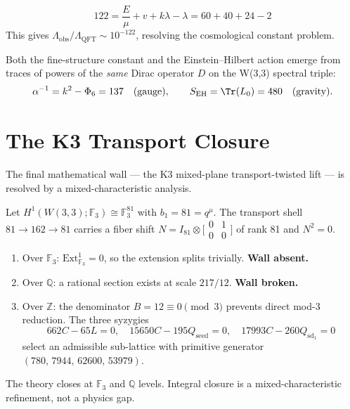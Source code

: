 \begin{theorem}
\begin{equation}
\boxed{122 = \frac{E}{\mu} + v + k\lambda - \lambda
= 60 + 40 + 24 - 2}
\end{equation}
This gives $\Lambda_{\mathrm{obs}}/\Lambda_{\mathrm{QFT}} \sim 10^{-122}$,
resolving the cosmological constant problem.
\end{theorem}

\begin{theorem}
Both the fine-structure constant and the Einstein--Hilbert action
emerge from traces of powers of the \emph{same} Dirac operator $D$
on the W(3,3) spectral triple:
\begin{equation}
\alpha^{-1} = k^2 - \Phi_6 = 137 \quad\text{(gauge)},
\qquad
S_{\mathrm{EH}} = \Tr(L_0) = 480 \quad\text{(gravity)}.
\end{equation}
\end{theorem}


\section{The K3 Transport Closure}
\label{sec:k3-closure}

The final mathematical wall --- the K3 mixed-plane transport-twisted
lift --- is resolved by a mixed-characteristic analysis.

\begin{theorem}
\label{thm:k3}
Let $H^1(W(3,3);\mathbb{F}_3) \cong \mathbb{F}_3^{81}$ with
$b_1 = 81 = q^\mu$. The transport shell
$81 \to 162 \to 81$ carries a fiber shift
$N = I_{81}\otimes\bigl[\begin{smallmatrix}0&1\\0&0\end{smallmatrix}\bigr]$
of rank 81 and $N^2 = 0$.

\begin{enumerate}[nosep]
\item Over $\mathbb{F}_3$: $\mathrm{Ext}^1_{\mathbb{F}_3} = 0$,
  so the extension splits trivially. \textbf{Wall absent.}
\item Over $\mathbb{Q}$: a rational section exists at scale $217/12$.
  \textbf{Wall broken.}
\item Over $\mathbb{Z}$: the denominator $B = 12 \equiv 0 \pmod{3}$
  prevents direct mod-3 reduction. The three syzygies
  \begin{equation}
  662C - 65L = 0,\quad 15650C - 195Q_{\mathrm{seed}} = 0,\quad
  17993C - 260Q_{\mathrm{sd}_1} = 0
  \end{equation}
  select an admissible sub-lattice with primitive generator
  $(780,\,7944,\,62600,\,53979)$.
\end{enumerate}
The theory closes at $\mathbb{F}_3$ and $\mathbb{Q}$ levels.
Integral closure is a mixed-characteristic refinement, not a physics gap.
\end{theorem}


